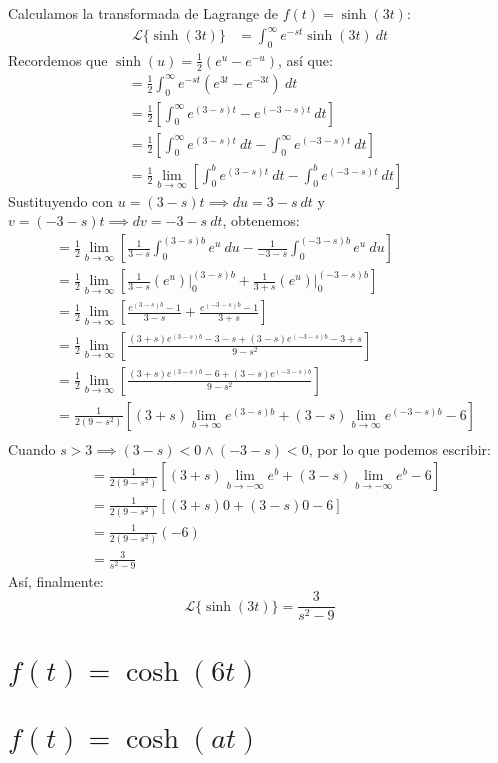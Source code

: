 \documentclass[12pt, a4paper]{article}
\begin{document}
Calculamos la transformada de Lagrange de \(f(t) = \sinh(3t)\):
\begin{align*}
	\mathcal{L}\{\sinh(3t)\} &= \int_{0}^{\infty} e^{-st} \sinh(3t) \ dt
\end{align*}
Recordemos que \(\sinh(u) = \frac{1}{2} (e^{u} - e^{-u})\), así que:
\begin{align*}
	&= \frac{1}{2} \int_{0}^{\infty} e^{-st} (e^{3t} - e^{-3t}) \ dt \\
	&= \frac{1}{2} \left[ \int_{0}^{\infty} e^{(3-s)t} - e^{(-3-s)t} \ dt \right] \\
	&= \frac{1}{2} \left[ \int_{0}^{\infty} e^{(3-s)t} \ dt - \int_{0}^{\infty} e^{(-3-s)t} \ dt \right] \\
	&= \frac{1}{2} \lim_{b \to \infty} \left[ \int_{0}^{b} e^{(3-s)t} \ dt - \int_{0}^{b} e^{(-3-s)t} \ dt \right]
\end{align*}
Sustituyendo con \(u = (3-s)t \implies du = 3-s\ dt\) y \(v = (-3-s)t \implies dv = -3-s\ dt\), obtenemos:
\begin{align*}
	&= \frac{1}{2} \lim_{b \to \infty} \left[ \frac{1}{3-s} \int_{0}^{(3-s)b} e^{u} \ du - \frac{1}{-3-s} \int_{0}^{(-3-s)b} e^{u} \ du \right] \\
	&= \frac{1}{2} \lim_{b \to \infty} \left[ \frac{1}{3-s} \left. \left( e^{u} \right) \right|_{0}^{(3-s)b} + \frac{1}{3+s} \left. \left( e^{u} \right) \right|_{0}^{(-3-s)b} \right] \\
	&= \frac{1}{2} \lim_{b \to \infty} \left[ \frac{e^{(3-s)b} - 1}{3-s} + \frac{e^{(-3-s)b} - 1}{3+s} \right] \\
	&= \frac{1}{2} \lim_{b \to \infty} \left[ \frac{(3+s) e^{(3-s)b} - 3 - s + (3-s)e^{(-3-s)b} - 3 + s}{9-s ^{2}} \right] \\
	&= \frac{1}{2} \lim_{b \to \infty} \left[ \frac{(3+s) e^{(3-s)b} - 6 + (3-s)e^{(-3-s)b}}{9-s ^{2}} \right] \\
	&= \frac{1}{2(9-s ^{2})} \left[ (3+s) \lim_{b \to \infty} e^{(3-s)b} + (3-s) \lim_{b \to \infty} e^{(-3-s)b} - 6 \right] \\
\end{align*}
Cuando \(s > 3 \implies (3-s) < 0 \land (-3-s) < 0\), por lo que podemos escribir:
\begin{align*}
	&= \frac{1}{2(9-s ^{2})} \left[ (3+s) \lim_{b \to -\infty} e^{b} + (3-s) \lim_{b \to -\infty} e^{b} - 6 \right] \\
	&= \frac{1}{2(9-s ^{2})} \left[ (3+s) 0 + (3-s) 0 - 6 \right] \\
	&= \frac{1}{2(9-s ^{2})} (-6) \\
	&= \frac{3}{s ^{2} - 9}
\end{align*}
Así, finalmente:
\[
	\mathcal{L}\{\sinh(3t)\} = \frac{3}{s ^{2} - 9}
\]


\section{\texorpdfstring{\(f(t)=\cosh(6t)\)}{f (t) = cosh (6t)}}


\setcounter{section}{16}
\section{\texorpdfstring{\(f(t)=\cosh(at)\)}{f (t) = cosh (at)}}
\end{document}
